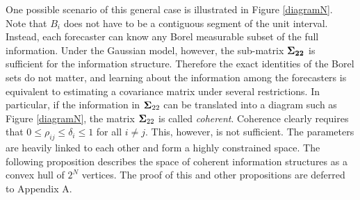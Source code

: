\documentclass[12pt]{article}
\theoremstyle{definition}
\newtheorem{example}[theorem]{Example}
\theoremstyle{definition}
\begin{document}
One possible scenario of this general case is illustrated in Figure \ref{diagramN}. Note that $B_i$ does not have to be a contiguous segment of the unit
interval.  Instead, each forecaster can know any Borel measurable
subset of the full information. Under the Gaussian model, however, the sub-matrix ${\bf \Sigma_{22}}$ is sufficient for the information structure. Therefore the exact identities of the Borel sets do not matter, and learning about the
information among the forecasters is equivalent to estimating a
covariance matrix under several restrictions.  In particular, if the
information in ${\bf\Sigma}_{22}$ can be translated into a diagram
such as Figure \ref{diagramN},
the matrix ${\bf\Sigma}_{22}$ is called \textit{coherent}.  Coherence
clearly requires that $0 \leq \rho_{ij} \leq \delta_i \leq 1$ for all $i \neq j$.  This, however, is not sufficient. The parameters are heavily linked to each other and form a highly constrained space. 
%
The following proposition describes the space of coherent information structures as a convex hull of $2^N$ vertices.
 The proof of this and other propositions are deferred to Appendix A.
\end{document}
